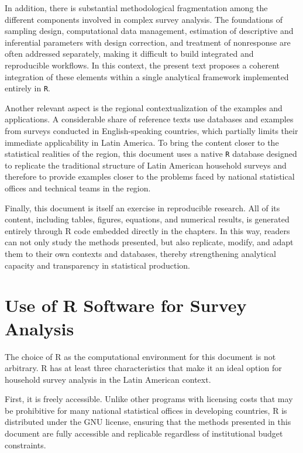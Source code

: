 \documentclass[
  english,
  12pt,
]{book}
\begin{document}
In addition, there is substantial methodological fragmentation among the different components involved in complex survey analysis. The foundations of sampling design, computational data management, estimation of descriptive and inferential parameters with design correction, and treatment of nonresponse are often addressed separately, making it difficult to build integrated and reproducible workflows. In this context, the present text proposes a coherent integration of these elements within a single analytical framework implemented entirely in \texttt{R}.

Another relevant aspect is the regional contextualization of the examples and applications. A considerable share of reference texts use databases and examples from surveys conducted in English-speaking countries, which partially limits their immediate applicability in Latin America. To bring the content closer to the statistical realities of the region, this document uses a native \texttt{R} database designed to replicate the traditional structure of Latin American household surveys and therefore to provide examples closer to the problems faced by national statistical offices and technical teams in the region.

Finally, this document is itself an exercise in reproducible research. All of its content, including tables, figures, equations, and numerical results, is generated entirely through R code embedded directly in the chapters. In this way, readers can not only study the methods presented, but also replicate, modify, and adapt them to their own contexts and databases, thereby strengthening analytical capacity and transparency in statistical production.

\section{Use of R Software for Survey Analysis}\label{use-of-r-software-for-survey-analysis}

The choice of R as the computational environment for this document is not arbitrary. R has at least three characteristics that make it an ideal option for household survey analysis in the Latin American context.

First, it is freely accessible. Unlike other programs with licensing costs that may be prohibitive for many national statistical offices in developing countries, R is distributed under the GNU license, ensuring that the methods presented in this document are fully accessible and replicable regardless of institutional budget constraints.
\end{document}
